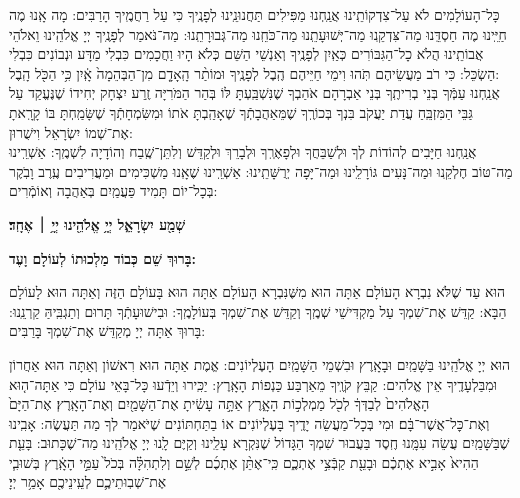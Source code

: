 \documentclass[twoside, openany, parskip=half, 11pt]{book}
\begin{document}
כָּל־הָעוֹלָמִים לֹא עַל־צִדְקוֹתֵֽינוּ אֲנַֽחְנוּ מַפִּילִים תַּחֲנוּנֵֽינוּ לְפָנֶֽיךָ כִּי עַל רַחֲמֶֽיךָ הָרַבִּים: מָה אָֽנוּ מֶה חַיֵּֽינוּ מֶה חַסְדֵּֽנוּ מַה־צִּדְקֵֽנוּ מַה־יְּשׁוּעָתֵֽנוּ מַה־כֹּחֵֽנוּ מַה־גְּבוּרָתֵֽנוּ: מַה־נֹּאמַר לְפָנֶֽיךָ יְיָ אֱלֹהֵֽינוּ וֵאלֹהֵי אֲבוֹתֵֽינוּ הֲלֹא כָל־הַגִּבּוֹרִים כְּאַֽיִן לְפָנֶֽיךָ וְאַנְשֵׁי הַשֵּׁם כְּלֹא הָיוּ וַחֲכָמִים כִּבְלִי מַדָּע וּנְבוֹנִים כִּבְלִי הַשְׂכֵּל: כִּי רֹב מַעֲשֵׂיהֶם תֹּֽהוּ וִימֵי חַיֵּיהֶם הֶֽבֶל לְפָנֶֽיךָ וּמוֹתַ֨ר הָֽאָדָ֤ם מִן־הַבְּהֵמָה֙ אָֽ֔יִן כִּ֥י הַכֹּ֖ל הָֽבֶל: \\
אֲנַֽחְנוּ עַמְּֿךָ בְּנֵי בְרִיתֶֽךָ בְּנֵי אַבְרָהָם אֹהַבְךָ שֶׁנִּשְׁבַּֽעְתָּ לּוֹ בְּהַר הַמֹּרִיָּה זֶֽרַע יִצְחָק יְחִידוֹ שֶׁנֶּעֱקַד עַל גַּבֵּי הַמִּזְבֵּֽחַ עֲדַת יַעֲקֹב בִּנְךָ בְּכוֹרֶֽךָ שֶׁמֵּאַהֲבָתְֿךָ שֶׁאָהַֽבְתָּ אֹתוֹ וּמִשִּׂמְחָתְֿךָ שֶׁשָּׂמַֽחְתָּ בּוֹ קָרָֽאתָ אֶת־שְׁמוֹ יִשְׂרָאֵל וִישֻׁרוּן: \\ 
אֲנַֽחְנוּ חַיָּבִים לְהוֹדוֹת לְךָ וּלְשַׁבֵּחֲךָ וּלְפָאֶרְֽךָ וּלְבָרֵךְ וּלְקַדֵּשׁ וְלִתֵּן־שֶֽׁבַח וְהוֹדָיָה לִשְׁמֶֽךָ: אַשְׁרֵֽינוּ מַה־טּוֹב חֶלְקֵֽנוּ וּמַה־נָּעִים גּוֹרָלֵֽינוּ וּמַה־יָּפָה יְרֻשָּׁתֵֽינוּ: אַשְׁרֵֽינוּ שֶׁאָֽנוּ מַשְׁכִּימִים וּמַעֲרִיבִים עֶֽרֶב וָבֹֽקֶר בְּכָל־יוֹם תָּמִיד פַּעֲמַֽיִם בְּאַהֲבָה וְאוֹמְֿרִים:

\begin{Large}
\textbf{שְׁמַ֖ע יִשְׂרָאֵ֑ל יְיָ֥ אֱלֹהֵ֖ינוּ יְיָ֥ ׀ אֶחָֽד׃}
\end{Large}

\textbf{%
בָּרוּךְ שֵׁם כְּבוֹד מַלְכוּתוֹ לְעוֹלָם וָעֶד:
}


הוּא עַד שֶׁלֹּא נִבְרָא הָעוֹלָם אַתָּה הוּא מִשֶּׁנִּבְרָא הָעוֹלָם אַתָּה הוּא בָּעוֹלָם הַזֶּה וְאַתָּה הוּא לָעוֹלָם הַבָּא: קַדֵּשׁ אֶת־שִׁמְךָ עַל מַקְדִּישֵׁי שְׁמֶֽךָ וְקַדֵּשׁ אֶת־שִׁמְךָ בְּעוֹלָמֶֽךָ: וּבִישׁוּעָתְֿךָ תָּרוּם וְתַגְבִּֽיהַּ קַרְנֵֽנוּ: בָּרוּךְ אַתָּה יְיָ מְקַדֵּשׁ אֶת־שִׁמְךָ בָּרַבִּים:
 
 הוּא יְיָ אֱלֹהֵֽינוּ בַּשָּׁמַֽיִם וּבָאָֽרֶץ וּבִשְׁמֵי הַשָּׁמַֽיִם הָעֶלְיוֹנִים: אֱמֶת אַתָּה הוּא רִאשׁוֹן וְאַתָּה הוּא אַחֲרוֹן וּמִבַּלְעָדֶֽיךָ אֵין אֱלֹהִים: קַבֵּץ קֹוֶֽיךָ מֵאַרְבַּע כַּנְפוֹת הָאָֽרֶץ: יַכִּֽירוּ וְיֵדְֿעוּ כָּל־בָּאֵי עוֹלָם כִּי אַתָּה־ה֤וּא הָאֱלֹהִים֙ לְבַדְּךָ֔ לְכֹ֖ל מַמְלְכ֣וֹת הָאָ֑רֶץ אַתָּ֣ה עָשִׂ֔יתָ אֶת־הַשָּׁמַ֖יִם וְאֶת־הָאָֽרֶץ׃ אֶת־הַיָּם֙ וְאֶת־כׇּל־אֲשֶׁר־בָּ֔ם׃ וּמִי בְּכָל־מַעֲשֵׂה יָדֶֽיךָ בָּעֶלְיוֹנִים אוֹ בַתַּחְתּוֹנִים שֶׁיֹּאמַר לְךָ מַה תַּעֲשֶׂה: אָבִֽינוּ שֶׁבַּשָּׁמַֽיִם עֲשֵׂה עִמָּֽנוּ חֶֽסֶד בַּעֲבוּר שִׁמְךָ הַגָּדוֹל שֶׁנִּקְרָא עָלֵֽינוּ וְקַיֶּם לָֽנוּ יְיָ אֱלֹהֵֽינוּ מַה־שֶׁכָּתוּב: בָּעֵ֤ת הַהִיא֙ אָבִ֣יא אֶתְכֶ֔ם וּבָעֵ֖ת קַבְּֿצִ֣י אֶתְכֶ֑ם כִּֽי־אֶתֵּ֨ן אֶתְכֶ֜ם לְשֵׁ֣ם וְלִתְהִלָּ֗ה בְּכֹל֙ עַמֵּ֣י הָאָֽ֔רֶץ בְּשׁוּבִ֧י אֶת־שְׁבֽוּתֵיכֶ֛ם לְעֵֽינֵיכֶ֖ם אָמַ֥ר יְיָ׃
\end{document}
